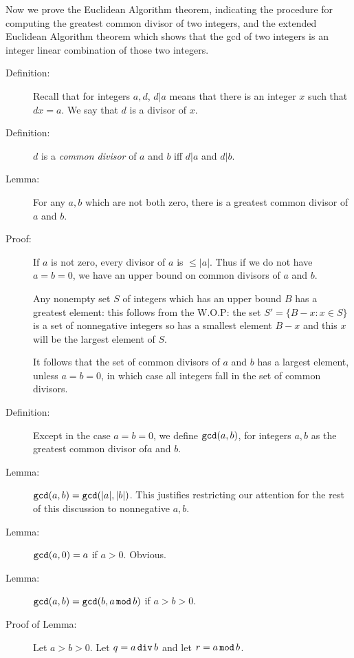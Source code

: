 \documentclass[12pt]{article}
\begin{document}
Now we prove the Euclidean Algorithm theorem, indicating the procedure for computing the greatest common divisor of two integers, and the extended Euclidean Algorithm theorem which shows that the gcd of two integers is an integer linear combination of those two integers.

\begin{description}

\item[Definition:]  Recall that for integers $a,d$, $d|a$ means that there is an integer $x$ such that $dx=a$.  We say that $d$ is a divisor of $x$.

\item[Definition:]  $d$ is a {\em common divisor\/} of $a$ and $b$ iff $d|a$ and $d|b$.

\item[Lemma:]  For any $a,b$ which are not both zero, there is a greatest common divisor of $a$ and $b$.

\item[Proof:]  If $a$ is not zero, every divisor of $a$ is $\leq |a|$.  Thus if we do not have $a=b=0$, we have an upper bound on common divisors of $a$ and $b$.

Any nonempty set $S$ of integers which has an upper bound $B$ has a greatest element:  this follows from the W.O.P:  the set $S'=\{B-x:x \in S\}$ is a set of nonnegative integers so has a smallest element $B-x$ and this $x$ will be the largest element of $S$.

It follows that the set of common divisors of $a$ and $b$ has a largest element, unless $a=b=0$, in which case all integers fall in the set of common divisors.

\item[Definition:]  Except in the case $a=b=0$, we define ${\tt gcd}(a,b)$, for integers $a,b$ as the greatest common divisor of$a$ and $b$.

\item[Lemma:]   ${\tt gcd}(a,b) = {\tt gcd}(|a|,|b|)$.  This justifies restricting our attention for the rest of this discussion to nonnegative $a,b$.

\item[Lemma:]  ${\tt gcd}(a,0)=a$ if $a>0$.  Obvious.

\item[Lemma:] ${\tt gcd}(a,b) = {\tt gcd}(b,a\,{\tt mod}\,b)$ if $a>b>0$.

\item[Proof of Lemma:]  Let $a>b>0$.  Let $q=a\,{\tt div}\,b$ and let $r=a\,{\tt mod}\,b$.


\end{description}
\end{document}
